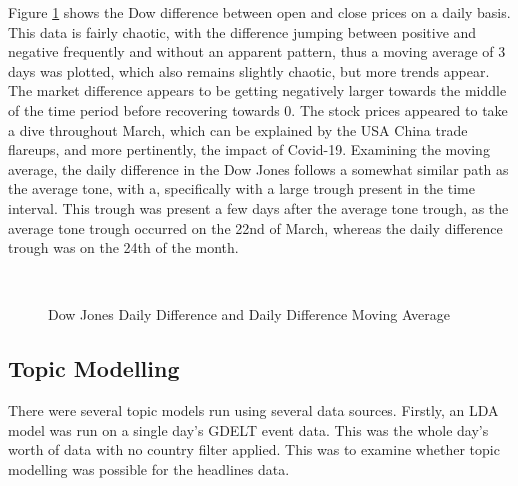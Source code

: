 Figure \ref{fig:dow_diff} shows the Dow difference between open and close prices on a daily basis. This data is fairly chaotic, with the difference jumping between positive and negative frequently and without an apparent pattern, thus a moving average of 3 days was plotted, which also remains slightly chaotic, but more trends appear. The market difference appears to be getting negatively larger towards the middle of the time period before recovering towards 0. The stock prices appeared to take a dive throughout March, which can be explained by the USA China trade flareups, and more pertinently, the impact of Covid-19. Examining the moving average, the daily difference in the Dow Jones follows a somewhat similar path as the average tone, with a, specifically with a large trough present in the time interval. This trough was present a few days after the average tone trough, as the average tone trough occurred on the 22nd of March, whereas the daily difference trough was on the 24th of the month.

\begin{figure}[H]
	\centering
	\\
	\caption{Dow Jones Daily Difference and Daily Difference Moving Average}
	\label{fig:dow_diff}
\end{figure}


\subsection{Topic Modelling}
There were several topic models run using several data sources. Firstly, an LDA model was run on a single day's GDELT event data. This was the whole day's worth of data with no country filter applied. This was to examine whether topic modelling was possible for the headlines data.  

